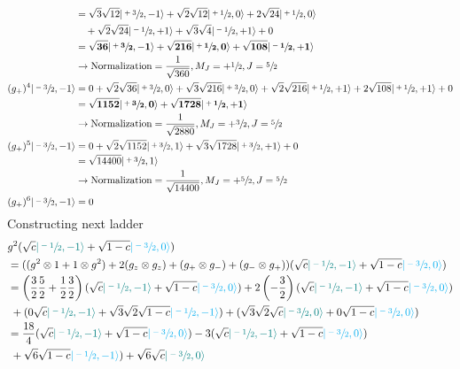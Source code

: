\documentclass[../main.tex]{subfiles}
\begin{document}
\begin{itemize}
\begin{align}
&=\sqrt{3}\sqrt{12}|\sfrac{+3}{2},-1\rangle+\sqrt{2}\sqrt{12}|\sfrac{+1}{2},0\rangle+2\sqrt{24}|\sfrac{+1}{2},0\rangle\\&\quad+\sqrt{2}\sqrt{24}|\sfrac{-1}{2},+1\rangle+\sqrt{3}\sqrt{4}|\sfrac{-1}{2},+1\rangle +0 \\
&=\mathbf{\sqrt{36}|\sfrac{+3}{2},-1\rangle+\sqrt{216}|\sfrac{+1}{2},0\rangle+\sqrt{108}|\sfrac{-1}{2},+1\rangle} \\
&\rightarrow \text{Normalization}=\frac{1}{\sqrt{360}},M_J=+\sfrac{1}{2},J=\sfrac{5}{2}\\
%
(g_+)^4|\sfrac{-3}{2},-1\rangle
&=0+\sqrt{2}\sqrt{36}|\sfrac{+3}{2},0\rangle+\sqrt{3}\sqrt{216}|\sfrac{+3}{2},0\rangle+\sqrt{2}\sqrt{216}|\sfrac{+1}{2},+1\rangle+2\sqrt{108}|\sfrac{+1}{2},+1\rangle+0\\
&=\mathbf{\sqrt{1152}|\sfrac{+3}{2},0\rangle+\sqrt{1728}|\sfrac{+1}{2},+1\rangle}\\
&\rightarrow \text{Normalization}=\frac{1}{\sqrt{2880}}, M_J=+\sfrac{3}{2},J=\sfrac{5}{2}\\
%
(g_+)^5|\sfrac{-3}{2},-1\rangle
&=0+\sqrt{2}\sqrt{1152}|\sfrac{+3}{2},1\rangle+\sqrt{3}\sqrt{1728}|\sfrac{+3}{2},+1\rangle+0\\
&=\sqrt{14400}|\sfrac{+3}{2},1\rangle\\
&\rightarrow\text{Normalization}=\frac{1}{\sqrt{14400}}, M_J=+\sfrac{5}{2},J=\sfrac{5}{2}\\
%
(g_+)^6|\sfrac{-3}{2},-1\rangle&=0
\end{align}
Constructing next ladder
\begin{align}
&g^2(\sqrt{c}\textcolor{teal}{|\sfrac{-1}{2},-1\rangle} + \sqrt{1-c}\textcolor{cyan}{|\sfrac{-3}{2},0\rangle})\\
&=((g^2\otimes1+1\otimes g^2)+2(g_z\otimes g_z)+(g_+\otimes g_-)+(g_-\otimes g_+))(\sqrt{c}\textcolor{teal}{|\sfrac{-1}{2},-1\rangle} + \sqrt{1-c}\textcolor{cyan}{|\sfrac{-3}{2},0\rangle})\\
&=\left(\frac{3}{2}\frac{5}{2}+\frac{1}{2}\frac{3}{2}\right)(\sqrt{c}\textcolor{teal}{|\sfrac{-1}{2},-1\rangle} + \sqrt{1-c}\textcolor{cyan}{|\sfrac{-3}{2},0\rangle})+2\left(-\frac{3}{2}\right)(\sqrt{c}\textcolor{teal}{|\sfrac{-1}{2},-1\rangle}
+ \sqrt{1-c}\textcolor{cyan}{|\sfrac{-3}{2},0\rangle})\\
&\;+(0\sqrt{c}\textcolor{teal}{|\sfrac{-1}{2},-1\rangle} + \sqrt{3}\sqrt{2}\sqrt{1-c}\textcolor{cyan}{|\sfrac{-1}{2},-1\rangle})+(\sqrt{3}\sqrt{2}\sqrt{c}\textcolor{teal}{|\sfrac{-3}{2},0\rangle} + 0\sqrt{1-c}\textcolor{cyan}{|\sfrac{-3}{2},0\rangle})\\
&=\frac{18}{4}(\sqrt{c}\textcolor{teal}{|\sfrac{-1}{2},-1\rangle} + \sqrt{1-c}\textcolor{cyan}{|\sfrac{-3}{2},0\rangle})-3(\sqrt{c}\textcolor{teal}{|\sfrac{-1}{2},-1\rangle}
+ \sqrt{1-c}\textcolor{cyan}{|\sfrac{-3}{2},0\rangle})\\
&\;+\sqrt{6}\sqrt{1-c}\textcolor{cyan}{|\sfrac{-1}{2},-1\rangle})+\sqrt{6}\sqrt{c}\textcolor{teal}{|\sfrac{-3}{2},0\rangle}
\end{align}


\end{itemize}
\end{document}
